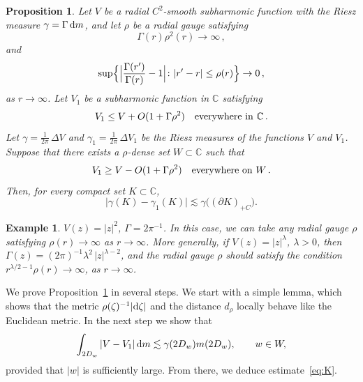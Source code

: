 \documentclass[11pt]{amsart}
\numberwithin{equation}{section}
\newtheorem{proposition}{Proposition}
\newtheorem{dugma}{Example}
\newcommand{\bC}{\mathbb C}
\begin{document}
\begin{proposition}\label{Lemma-subharm}
Let $V$ be a radial $C^2$-smooth subharmonic function with the Riesz measure
$\gamma = \Gamma\, {\rm d}m$, and let $\rho$ be a radial gauge satisfying
\begin{equation}\label{eq-1}
\Gamma (r) \rho^2(r) \to \infty\,,
\end{equation}
and
\begin{equation}\label{eq-2}
\sup\Bigl\{ \Bigl| \frac{\Gamma(r')}{\Gamma(r)} - 1\Bigr|\colon
|r'-r|\le\rho(r) \Bigr\} \to 0\,,
\end{equation}
as $r\to\infty$.
Let $V_1$ be a subharmonic function in $\bC$ satisfying
\begin{equation}\label{eq-3}
V_1 \le V + O(1+\Gamma\rho^2) \quad {\rm everywhere\ in\ } \bC\,.
\end{equation}
Let $\gamma = \tfrac1{2\pi}\, \Delta V$ and $\gamma_1 = \tfrac1{2\pi}\, \Delta V_1$ be the Riesz measures of the functions $V$ and $V_1$.
Suppose that there exists a $\rho$-dense set $W\subset\bC$ such that
\begin{equation}\label{eq-4}
V_1 \ge V - O(1+\Gamma\rho^2) \quad {\rm everywhere\ on\ } W\,.
\end{equation}
Then, for every compact set $K\subset \bC$,
\begin{equation}\label{eq:K}
\bigl| \gamma(K) - \gamma_1(K) \bigr| \lesssim \gamma\bigl( (\partial K)_{+C} \bigr).
\end{equation}
\end{proposition}

\begin{dugma}\label{dugma}
{\rm $V(z)=|z|^2$, $\Gamma = 2\pi^{-1}$. In this case, we can take any radial gauge
$\rho$ satisfying $\rho(r)\to\infty$ as $r\to\infty$.
More generally, if $V(z)=|z|^{\lambda}$, $\lambda>0$, then
$\Gamma (z) = (2\pi)^{-1}\lambda^2\, |z|^{\lambda-2}$, and the radial gauge $\rho$
should satisfy the condition $r^{\lambda/2 - 1}\rho(r)\to\infty$, as $r\to\infty$}.
\end{dugma}

We prove Proposition~\ref{Lemma-subharm} in several steps. We start with a simple lemma, which
shows that the metric $\rho(\zeta)^{-1}|{\rm d}\zeta|$ and
the distance $d_\rho$ locally behave like the Euclidean metric.
In the next step we show that
\[
\int_{2D_w} |V-V_1|\, {\rm d}m \lesssim \gamma(2D_w)m(2D_w), \qquad w\in W,
\]
provided that $|w|$ is sufficiently large.
From there, we deduce estimate~\eqref{eq:K}.
\end{document}
